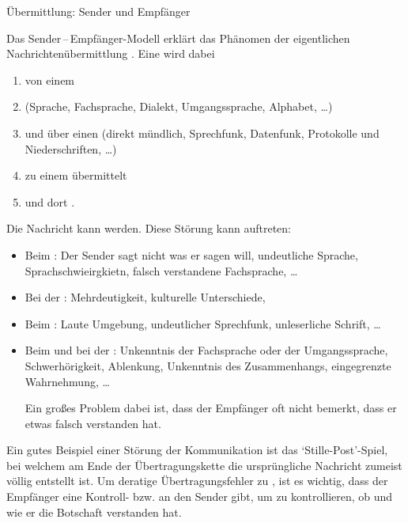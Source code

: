 {Übermittlung: Sender und Empfänger}
{%
Das Sender\,--\,Empfänger-Modell erklärt das Phänomen der 
eigentlichen Nachrichtenübermittlung \cite{Informatik3}.
Eine  wird dabei 
\begin{enumerate}
  \item von
  einem 
  \item {} (Sprache, Fachsprache, Dialekt,
  Umgangssprache, Alphabet, \ldots)
  \item und über einen  (direkt mündlich,
  Sprechfunk, Datenfunk, Protokolle und Niederschriften, \ldots)
  \item zu einem  übermittelt
  \item und dort .
\end{enumerate}
Die Nachricht kann  werden.
Diese Störung kann auftreten:
\begin{itemize}
  \item Beim : Der Sender sagt nicht was er sagen
  will, undeutliche Sprache, Sprachschwieirgkietn, 
  falsch verstandene Fachsprache, \ldots
  \item Bei der : Mehrdeutigkeit, kulturelle
  Unterschiede,
  \item Beim : Laute Umgebung,
  undeutlicher Sprechfunk, unleserliche Schrift, \ldots
  \item Beim  und bei der :
  Unkenntnis der Fachsprache oder der Umgangssprache, Schwerhörigkeit, Ablenkung, Unkenntnis
  des Zusammenhangs, eingegrenzte Wahrnehmung, \ldots
  
  Ein großes Problem dabei ist, dass der Empfänger oft
  nicht bemerkt, dass er etwas falsch verstanden hat.
\end{itemize}


Ein gutes Beispiel einer Störung der Kommunikation ist das
\enquote*{Stille-Post}-Spiel, bei welchem am Ende der
Übertragungskette die ursprüngliche Nachricht zumeist völlig
entstellt ist. Um deratige Übertragungsfehler zu
, ist es wichtig, dass der Empfänger eine
Kontroll- bzw.  an den Sender gibt, um zu
kontrollieren, ob und wie er die Botschaft verstanden hat.

}
{}
{}
{}
{}

\bigskip 

